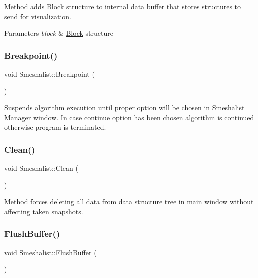 Method adds \hyperlink{class_block}{Block} structure to internal data buffer that stores structures to send for visualization. 
\begin{DoxyParams}{Parameters}
{\em block} & \hyperlink{class_block}{Block} structure \\
\hline
\end{DoxyParams}
\hypertarget{class_smeshalist_a096f7b67b9bb28c4b70274812d45db36}{}\label{class_smeshalist_a096f7b67b9bb28c4b70274812d45db36} 
\subsubsection{\texorpdfstring{Breakpoint()}{Breakpoint()}}
{\footnotesize\ttfamily void Smeshalist\+::\+Breakpoint (\begin{DoxyParamCaption}{ }\end{DoxyParamCaption})}

Suspends algorithm execution until proper option will be chosen in \hyperlink{class_smeshalist}{Smeshalist} Manager window. In case continue option has been chosen algorithm is continued otherwise program is terminated. \hypertarget{class_smeshalist_a0bdba425a903528f2ecef7297da7486e}{}\label{class_smeshalist_a0bdba425a903528f2ecef7297da7486e} 
\subsubsection{\texorpdfstring{Clean()}{Clean()}}
{\footnotesize\ttfamily void Smeshalist\+::\+Clean (\begin{DoxyParamCaption}{ }\end{DoxyParamCaption})}

Method forces deleting all data from data structure tree in main window without affecting taken snapshots. \hypertarget{class_smeshalist_a312ced405b18cf134ee15d7ea66b2632}{}\label{class_smeshalist_a312ced405b18cf134ee15d7ea66b2632} 
\subsubsection{\texorpdfstring{Flush\+Buffer()}{FlushBuffer()}}
{\footnotesize\ttfamily void Smeshalist\+::\+Flush\+Buffer (\begin{DoxyParamCaption}{ }\end{DoxyParamCaption})}

